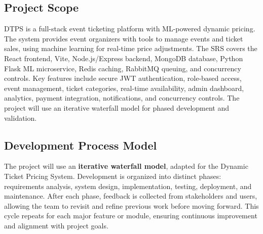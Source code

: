 \documentclass[11pt,a4paper]{article}
\begin{document}
\subsection{Project Scope}
DTPS is a full-stack event ticketing platform with ML-powered dynamic pricing. The system provides event organizers with tools to manage events and ticket sales, using machine learning for real-time price adjustments. The SRS covers the React frontend, Vite, Node.js/Express backend, MongoDB database, Python Flask ML microservice, Redis caching, RabbitMQ queuing, and concurrency controls. Key features include secure JWT authentication, role-based access, event management, ticket categories, real-time availability, admin dashboard, analytics, payment integration, notifications, and concurrency controls. The project will use an iterative waterfall model for phased development and validation.

\subsection{Development Process Model}

The project will use an \textbf{iterative waterfall model}, adapted for the Dynamic Ticket Pricing System. Development is organized into distinct phases: requirements analysis, system design, implementation, testing, deployment, and maintenance. After each phase, feedback is collected from stakeholders and users, allowing the team to revisit and refine previous work before moving forward. This cycle repeats for each major feature or module, ensuring continuous improvement and alignment with project goals.
\end{document}
